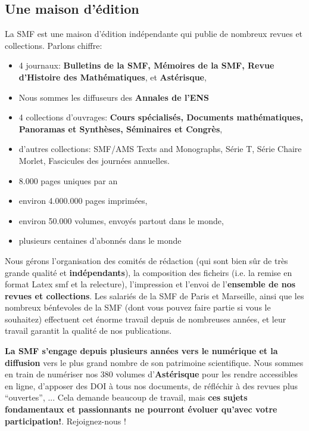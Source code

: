 \subsection{Une maison d'\'{e}dition}
La SMF est une maison d'\'edition ind\'ependante qui publie de nombreux revues et collections. Parlons chiffre:\begin{itemize}
\item
4 journaux: {\bf Bulletins de la SMF, M\'emoires de la SMF, Revue d'Histoire des Math\'ematiques}, et {\bf Ast\'erisque},
\item
Nous sommes les diffuseurs des {\bf Annales de l'ENS}
\item
4 collections d'ouvrages: {\bf Cours sp\'ecialis\'es,
Documents math\'ematiques, Panoramas et Synth\`eses, S\'eminaires et Congr\`es},

\item
d'autres collections: SMF/AMS Texts and Monographs, S\'erie T, S\'erie Chaire Morlet, Fascicules des journ\'ees annuelles.
\item
 8.000 pages uniques par an

\item
 environ 4.000.000 pages imprim\'ees, 
 \item
 environ 50.000 volumes, envoy\'es partout dans le monde,

\item
 plusieurs centaines d'abonn\'es dans le monde
\end{itemize}

Nous g\'erons l'organisation des comit\'es de r\'edaction (qui sont bien s\^ur de tr\`es grande qualit\'e et {\bf ind\'ependants}), la composition des ficheirs (i.e. la remise en format Latex smf et la relecture), l'impression et l'envoi de l'{\bf ensemble de nos revues et collections}. Les salari\'es de la SMF de Paris et Marseille, ainsi que les nombreux b\'en\'tevoles de la SMF (dont vous pouvez faire partie si vous le souhaitez) effectuent cet \'enorme travail depuis de nombreuses ann\'ees, et leur travail garantit la qualit\'e de nos publications.



{\bf La SMF s'engage depuis plusieurs ann\'ees vers le num\'erique et la diffusion} vers le plus grand nombre de son patrimoine scientifique. Nous sommes en train de num\'eriser nos 380 volumes d'{\bf Ast\'erisque} pour les rendre accessibles en ligne,  d'apposer des DOI \`a tous nos documents, de r\'efl\'echir \`a des revues plus ``ouvertes'', ... Cela demande beaucoup de travail, mais {\bf ces sujets fondamentaux et passionnants ne pourront \'evoluer qu'avec votre participation!}. Rejoignez-nous ! 

